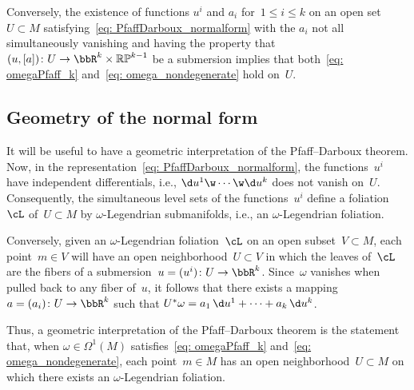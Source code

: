 Conversely, the existence of functions $u^i$ and $a_i$ for~$1\le i\le k$
on an open set~$U\subset M$ satisfying~\eqref{eq: PfaffDarboux_normalform}
with the $a_i$ not all simultaneously vanishing and having the
property that $(u,[a]) \colon U\to\bbR^k\times\mathbb{RP}^{k-1}$
be a submersion implies that both~\eqref{eq: omegaPfaff_k}
and~\eqref{eq: omega_nondegenerate} hold on~$U$.

\subsection{Geometry of the normal form}
It will be useful to have a geometric interpretation
of the Pfaff--Darboux theorem.
Now, in the representation~\eqref{eq: PfaffDarboux_normalform},
the functions~$u^i$ have independent differentials,
i.e., $\d u^1\w\cdots\w\d u^k$ does not vanish on~$U$.
Consequently, the simultaneous level sets of the functions~$u^i$
define a foliation~$\cL$ of~$U\subset M$
by $\omega$-Legendrian submanifolds, i.e., an $\omega$-Legendrian foliation.

Conversely, given an $\omega$-Legendrian foliation~$\cL$
on an open subset~$V\subset M$, each point~$m\in V$ will
have an open neighborhood~$U\subset V$ in which the leaves of~$\cL$
are the fibers of a submersion~${u = (u^i) \colon U\to\bbR^k}$.
Since~$\omega$ vanishes when pulled back to any fiber of~$u$,
it follows that there exists a mapping~$a = (a_i) \colon U\to\bbR^k$
such that $U^*\omega = a_1\,\d u^1 + \cdots + a_k\,\d u^k$.

Thus, a geometric interpretation of the Pfaff--Darboux theorem
is the statement that,
when $\omega\in\Omega^1(M)$ satisfies~\eqref{eq: omegaPfaff_k}
and~\eqref{eq: omega_nondegenerate}, each point~$m\in M$
has an open neighborhood~$U\subset M$
on which there exists an $\omega$-Legendrian foliation.

